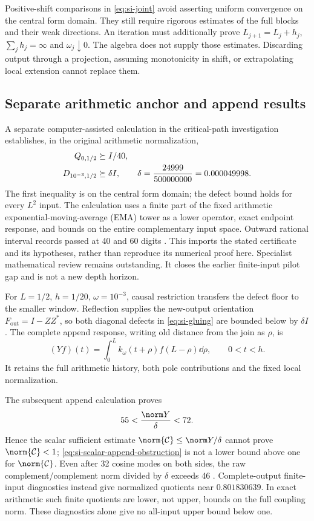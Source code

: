 Positive-shift comparisons in \eqref{eq:si-joint} avoid asserting
uniform convergence on the central form domain. They still require
rigorous estimates of the full blocks and their weak directions.
An iteration must additionally prove
$L_{j+1}=L_j+h_j$, $\sum_jh_j=\infty$ and
$\omega_j\downarrow0$. The algebra does not supply those estimates.
Discarding output through a projection, assuming monotonicity
in shift, or extrapolating local extension cannot replace them.

\subsection{Separate arithmetic anchor and append results}
\label{subsec:si-ema-progress}

A separate computer-assisted calculation in the critical-path
investigation establishes, in the original arithmetic normalization,
\begin{align}\label{eq:si-ema-anchor}
 Q_{0,1/2}&\succeq I/40,\\
 D_{10^{-3},1/2}&\succeq\delta I,\qquad
 \delta=\frac{24999}{500000000}=0.000049998.
 \notag
\end{align}
The first inequality is on the central form domain; the defect
bound holds for every $L^2$ input. The calculation uses a finite
part of the fixed arithmetic exponential-moving-average (EMA)
tower as a lower operator, exact endpoint response, and bounds
on the entire complementary input space. Outward rational interval
records passed at 40 and 60 digits \cite{EMAAnchor}.
This imports the stated certificate and its hypotheses, rather
than reproduce its numerical proof here. Specialist mathematical
review remains outstanding. It closes the earlier finite-input
pilot gap and is not a new depth horizon.

For $L=1/2$, $h=1/20$, $\omega=10^{-3}$, causal restriction transfers
the defect floor to the smaller window. Reflection supplies the
new-output orientation $F_{\mathrm{out}}=I-ZZ^*$, so both diagonal
defects in \eqref{eq:si-gluing} are bounded below by $\delta I$.
The complete append response, writing old distance from the join
as $\rho$, is
\[
 (Yf)(t)=\int_0^L k_\omega(t+\rho)f(L-\rho)\dd\rho,
 \qquad 0<t<h.
\]
It retains the full arithmetic history, both pole contributions
and the fixed local normalization.

The subsequent append calculation proves
\begin{equation}\label{eq:si-scalar-append-obstruction}
 55<\frac{\norm Y}{\delta}<72.
\end{equation}
Hence the scalar sufficient estimate
$\norm{\mathcal C}\leq\norm Y/\delta$ cannot prove
$\norm{\mathcal C}<1$; \eqref{eq:si-scalar-append-obstruction}
is not a lower bound above one for $\norm{\mathcal C}$.
Even after 32 cosine modes on both sides, the raw
complement/complement norm divided by $\delta$ exceeds 46
\cite{CumulativeAppend}. Complete-output finite-input diagnostics
instead give normalized quotients near $0.801830639$.
In exact arithmetic such finite quotients are lower, not upper,
bounds on the full coupling norm. These diagnostics alone give
no all-input upper bound below one.

